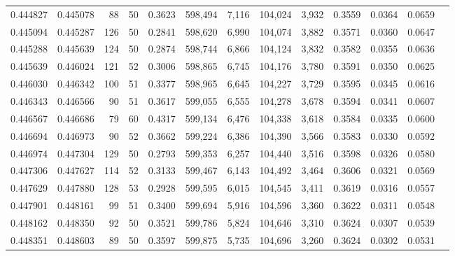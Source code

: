 \begin{tabular}{rrrrrrrrrrrrr}
0.444827 & 0.445078 &    88 &  50 &                                     0.3623 & 598,494 &   7,116 & 104,024 &   3,932 & 0.3559 & 0.0364 & 0.0659 \\
0.445094 & 0.445287 &   126 &  50 &                                     0.2841 & 598,620 &   6,990 & 104,074 &   3,882 & 0.3571 & 0.0360 & 0.0647 \\
0.445288 & 0.445639 &   124 &  50 &                                     0.2874 & 598,744 &   6,866 & 104,124 &   3,832 & 0.3582 & 0.0355 & 0.0636 \\
0.445639 & 0.446024 &   121 &  52 &                                     0.3006 & 598,865 &   6,745 & 104,176 &   3,780 & 0.3591 & 0.0350 & 0.0625 \\
0.446030 & 0.446342 &   100 &  51 &                                     0.3377 & 598,965 &   6,645 & 104,227 &   3,729 & 0.3595 & 0.0345 & 0.0616 \\
0.446343 & 0.446566 &    90 &  51 &                                     0.3617 & 599,055 &   6,555 & 104,278 &   3,678 & 0.3594 & 0.0341 & 0.0607 \\
0.446567 & 0.446686 &    79 &  60 &                                     0.4317 & 599,134 &   6,476 & 104,338 &   3,618 & 0.3584 & 0.0335 & 0.0600 \\
0.446694 & 0.446973 &    90 &  52 &                                     0.3662 & 599,224 &   6,386 & 104,390 &   3,566 & 0.3583 & 0.0330 & 0.0592 \\
0.446974 & 0.447304 &   129 &  50 &                                     0.2793 & 599,353 &   6,257 & 104,440 &   3,516 & 0.3598 & 0.0326 & 0.0580 \\
0.447306 & 0.447627 &   114 &  52 &                                     0.3133 & 599,467 &   6,143 & 104,492 &   3,464 & 0.3606 & 0.0321 & 0.0569 \\
0.447629 & 0.447880 &   128 &  53 &                                     0.2928 & 599,595 &   6,015 & 104,545 &   3,411 & 0.3619 & 0.0316 & 0.0557 \\
0.447901 & 0.448161 &    99 &  51 &                                     0.3400 & 599,694 &   5,916 & 104,596 &   3,360 & 0.3622 & 0.0311 & 0.0548 \\
0.448162 & 0.448350 &    92 &  50 &                                     0.3521 & 599,786 &   5,824 & 104,646 &   3,310 & 0.3624 & 0.0307 & 0.0539 \\
0.448351 & 0.448603 &    89 &  50 &                                     0.3597 & 599,875 &   5,735 & 104,696 &   3,260 & 0.3624 & 0.0302 & 0.0531 \\

\end{tabular}
